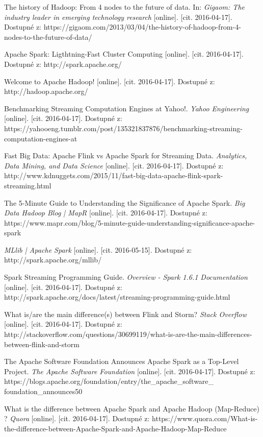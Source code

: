 \documentclass[thesis=B,czech]{FITthesis}[2012/06/26]
\begin{document}
\begin{thebibliography}{1}
The history of Hadoop: From 4 nodes to the future of data. In: \textit{Gigaom: The industry leader in emerging technology research} [online]. [cit. 2016-04-17]. Dostupné z: https://gigaom.com/2013/03/04/the-history-of-hadoop-from-4-nodes-to-the-future-of-data/

Apache Spark: Ligthtning-Fast Cluster Computing [online]. [cit. 2016-04-17]. Dostupné z: http://spark.apache.org/

Welcome to Apache Hadoop! [online]. [cit. 2016-04-17]. Dostupné z: http://hadoop.apache.org/

Benchmarking Streaming Computation Engines at Yahoo!. \textit{Yahoo Engineering} [online]. [cit. 2016-04-17]. Dostupné z: https://yahooeng.tumblr.com/post/135321837876/benchmarking-streaming-computation-engines-at

Fast Big Data: Apache Flink vs Apache Spark for Streaming Data. \textit{Analytics, Data Mining, and Data Science} [online]. [cit. 2016-04-17]. Dostupné z: http://www.kdnuggets.com/2015/11/fast-big-data-apache-flink-spark-streaming.html

The 5-Minute Guide to Understanding the Significance of Apache Spark. \textit{Big Data Hadoop Blog | MapR} [online]. [cit. 2016-04-17]. Dostupné z: https://www.mapr.com/blog/5-minute-guide-understanding-significance-apache-spark

\textit{MLlib | Apache Spark} [online]. [cit. 2016-05-15]. Dostupné z: http://spark.apache.org/mllib/

Spark Streaming Programming Guide. \textit{Overview - Spark 1.6.1 Documentation} [online]. [cit. 2016-04-17]. Dostupné z: http://spark.apache.org/docs/latest/streaming-programming-guide.html

What is/are the main difference(s) between Flink and Storm? \textit{Stack Overflow} [online]. [cit. 2016-04-17]. Dostupné z: http://stackoverflow.com/questions/30699119/what-is-are-the-main-differences-between-flink-and-storm

The Apache Software Foundation Announces Apache Spark as a Top-Level Project. \textit{The Apache Software Foundation} [online]. [cit. 2016-04-17]. Dostupné z: https://blogs.apache.org/foundation/entry/the\_apache\_software\_\\foundation\_announces50

What is the difference between Apache Spark and Apache Hadoop (Map-Reduce) ? \textit{Quora} [online]. [cit. 2016-04-17]. Dostupné z: https://www.quora.com/What-is-the-difference-between-Apache-Spark-and-Apache-Hadoop-Map-Reduce


\end{thebibliography}
\end{document}
